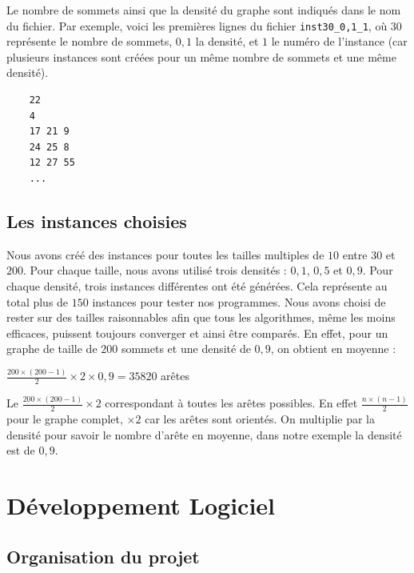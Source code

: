 \documentclass[a4paper]{article}
\begin{document}
Le nombre de sommets ainsi que la densité du graphe sont indiqués dans le nom du fichier. Par exemple, voici les premières lignes du fichier \texttt{inst30\_0,1\_1}, où $30$ représente le nombre de sommets, $0{,}1$ la densité, et $1$ le numéro de l’instance (car plusieurs instances sont créées pour un même nombre de sommets et une même densité).
\begin{center}
\noindent
\begin{minipage}{0.6\linewidth}  %
\begin{lstlisting}
	22
	4
	17 21 9
	24 25 8
	12 27 55
	...
\end{lstlisting}
\end{minipage}
\end{center}

\subsection{Les instances choisies}

Nous avons créé des instances pour toutes les tailles multiples de $10$ entre $30$ et $200$. Pour chaque taille, nous avons utilisé trois densités : $0{,}1$, $0{,}5$ et $0{,}9$. Pour chaque densité, trois instances différentes ont été générées. Cela représente au total plus de $150$ instances pour tester nos programmes.
Nous avons choisi de rester sur des tailles raisonnables afin que tous les algorithmes, même les moins efficaces, puissent toujours converger et ainsi être comparés. En effet, pour un graphe de taille de $200$ sommets et une densité de $0{,}9$, on obtient en moyenne :

\begin{center}
$\frac{200 \times (200-1)}{2} \times 2 \times 0{,}9 = 35 820$ arêtes
\end{center}
Le $\frac{200 \times (200-1)}{2} \times 2$ correspondant à toutes les arêtes possibles. En effet $\frac{n \times (n-1)}{2}$ pour le graphe complet, $\times 2$ car les arêtes sont orientés. On multiplie par la densité pour savoir le nombre d'arête en moyenne, dans notre exemple la densité est de $0,9$.
\section{Développement Logiciel}

\subsection{Organisation du projet}
\end{document}
